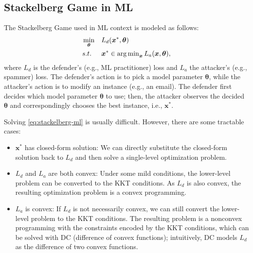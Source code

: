 

\subsection{Stackelberg Game in ML}
    The Stackelberg Game used in ML context is modeled as follows:
        \begin{equation}\label{eq:stackelberg-ml}
            \begin{aligned}
                    & \min_{\bm{\theta}} & & L_d(\bm{x}^\ast, \bm{\theta}) \\
                    & s.t.               & & \bm{x}^\ast \in \operatorname{arg\,min}_{\bm{x}} L_a(\bm{x}, \bm{\theta}),
            \end{aligned}
        \end{equation}
    where $L_d$ is the defender's (e.g., ML practitioner) loss and $L_a$ the attacker's (e.g., spammer) loss.
    The defender's action is to pick a model parameter $\bm{\theta}$, while the attacker's action is to modify an instance (e.g., an email).
    The defender first decides which model parameter $\bm{\theta}$ to use; then, the attacker observes the decided $\bm{\theta}$ and correspondingly chooses the best instance, i.e., $\bm{x}^\ast$.
    
    Solving \eqref{eq:stackelberg-ml} is usually difficult.
    However, there are some tractable cases:
        \begin{itemize}
            \item $\bm{x}^\ast$ has closed-form solution: We can directly substitute the closed-form solution back to $L_d$ and then solve a single-level optimization problem.
            \item $L_d$ and $L_a$ are both convex: Under some mild conditions, the lower-level problem can be converted to the KKT conditions.
            As $L_d$ is also convex, the resulting optimization problem is a convex programming.
            \item $L_a$ is convex: If $L_d$ is not necessarily convex, we can still convert the lower-level problem to the KKT conditions. 
            The resulting problem is a nonconvex programming with the constraints encoded by the KKT conditions, which can be solved with DC (difference of convex functions); intuitively, DC models $L_d$ as the difference of two convex functions.
        \end{itemize}
    